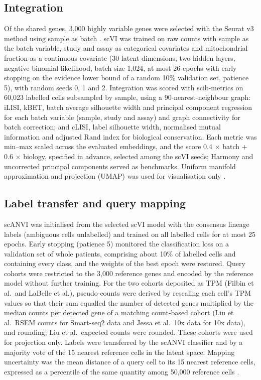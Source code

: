 \documentclass[11pt,a4paper]{article}
\begin{document}
\subsection{Integration}
Of the shared genes, 3,000 highly variable genes were selected with the Seurat v3 method using sample as batch
\citep{stuart2019comprehensive}. scVI \citep{lopez2018deep} was trained on raw counts with sample as the batch variable,
study and assay as categorical covariates and mitochondrial fraction as a continuous covariate (30 latent dimensions, two
hidden layers, negative binomial likelihood, batch size 1,024, at most 26 epochs with early stopping on the evidence lower
bound of a random 10\% validation set, patience 5), with random seeds 0, 1 and 2. Integration was scored with scib-metrics
\citep{luecken2021benchmarking} on 60,023 labelled cells subsampled by sample, using a 90-nearest-neighbour graph: iLISI,
kBET, batch average silhouette width and principal component regression for each batch variable (sample, study and assay)
and graph connectivity for batch correction; and cLISI, label silhouette width, normalised mutual information and adjusted
Rand index for biological conservation. Each metric was min--max scaled across the evaluated embeddings, and the score
0.4 $\times$ batch + 0.6 $\times$ biology, specified in advance, selected among the scVI seeds; Harmony
\citep{korsunsky2019fast} and uncorrected principal components served as benchmarks. Uniform manifold approximation and
projection (UMAP) was used for visualisation only \citep{becht2018dimensionality}.

\subsection{Label transfer and query mapping}
scANVI \citep{xu2021probabilistic} was initialised from the selected scVI model with the consensus lineage labels (ambiguous
cells unlabelled) and trained on all labelled cells for at most 25 epochs. Early stopping (patience 5) monitored the
classification loss on a validation set of whole patients, comprising about 10\% of labelled cells and containing every
class, and the weights of the best epoch were restored. Query cohorts were restricted to the 3,000 reference genes and
encoded by the reference model without further training. For the two cohorts deposited as TPM (Filbin et al.\ and
LaBelle et al.), pseudo-counts were derived by rescaling each cell's TPM values so that their sum equalled the number of
detected genes multiplied by the median counts per detected gene of a matching count-based cohort (Liu et al.\ RSEM
counts for Smart-seq2 data and Jessa et al.\ 10x data for 10x data), and rounding; Liu et al.\ expected counts were
rounded. These cohorts were used for projection only. Labels were transferred by the scANVI classifier and by a
majority vote of the 15 nearest reference cells in the latent space. Mapping uncertainty was the mean distance of a query
cell to its 15 nearest reference cells, expressed as a percentile of the same quantity among 50,000 reference cells
\citep{lotfollahi2021mapping}.
\end{document}

